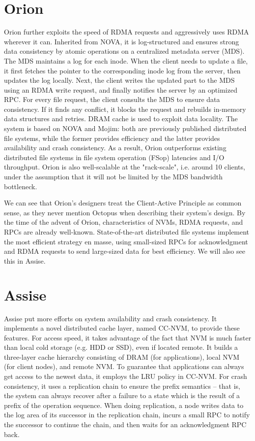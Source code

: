 \begin{survey}
\section{Orion}
Orion further exploits the speed of RDMA requests and aggressively uses RDMA wherever it can. Inherited from NOVA\cite{xu2016}, it is log-structured and ensures strong data consistency by atomic operations on a centralized metadata server (MDS). The MDS maintains a log for each inode. When the client needs to update a file, it first fetches the pointer to the corresponding inode log from the server, then updates the log locally. Next, the client writes the updated part to the MDS using an RDMA write request, and finally notifies the server by an optimized RPC. For every file request, the client consults the MDS to ensure data consistency. If it finds any conflict, it blocks the request and rebuilds in-memory data structures and retries. DRAM cache is used to exploit data locality. The system is based on NOVA and Mojim: both are previously published distributed file systems, while the former provides efficiency and the latter provides availability and crash consistency. As a result, Orion outperforms existing distributed file systems in file system operation (FSop) latencies and I/O throughput. Orion is also well-scalable at the "rack-scale", i.e. around 10 clients, under the assumption that it will not be limited by the MDS bandwidth bottleneck.

We can see that Orion’s designers treat the Client-Active Principle as common sense, as they never mention Octopus when describing their system’s design. By the time of the advent of Orion, characteristics of NVMs, RDMA requests, and RPCs are already well-known. State-of-the-art distributed file systems implement the most efficient strategy en masse, using small-sized RPCs for acknowledgment and RDMA requests to send large-sized data for best efficiency. We will also see this in Assise.

\section{Assise}
Assise put more efforts on system availability and crash consistency. It implements a novel distributed cache layer, named CC-NVM, to provide these features. For access speed, it takes advantage of the fact that NVM is much faster than local cold storage (e.g. HDD or SSD), even if located remote. It builds a three-layer cache hierarchy consisting of DRAM (for applications), local NVM (for client nodes), and remote NVM. To guarantee that applications can always get access to the newest data, it employs the LRU policy in CC-NVM. For crash consistency, it uses a replication chain to ensure the prefix semantics – that is, the system can always recover after a failure to a state which is the result of a prefix of the operation sequence. When doing replication, a node writes data to the log area of its successor in the replication chain, incurs a small RPC to notify the successor to continue the chain, and then waits for an acknowledgment RPC back.


\end{survey}
